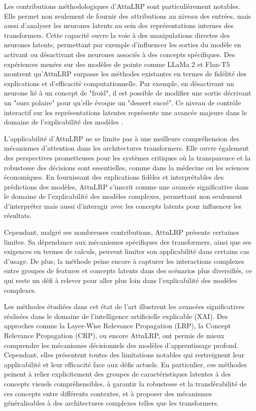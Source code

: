 \documentclass[runningheads]{llncs}
\begin{document}
Les contributions méthodologiques d’AttnLRP sont particulièrement notables. Elle permet non seulement de fournir des attributions au niveau des entrées, mais aussi d’analyser les neurones latents au sein des représentations internes des transformers. Cette capacité ouvre la voie à des manipulations directes des neurones latents, permettant par exemple d’influencer les sorties du modèle en activant ou désactivant des neurones associés à des concepts spécifiques. Des expériences menées sur des modèles de pointe comme LLaMa 2 et Flan-T5 montrent qu’AttnLRP surpasse les méthodes existantes en termes de fidélité des explications et d’efficacité computationnelle. Par exemple, en désactivant un neurone lié à un concept de "froid", il est possible de modifier une sortie décrivant un "ours polaire" pour qu’elle évoque un "dessert sucré". Ce niveau de contrôle interactif sur les représentations latentes représente une avancée majeure dans le domaine de l’explicabilité des modèles \autocite{pmlr-v235-achtibat24a}.

L’applicabilité d’AttnLRP ne se limite pas à une meilleure compréhension des mécanismes d’attention dans les architectures transformers. Elle ouvre également des perspectives prometteuses pour les systèmes critiques où la transparence et la robustesse des décisions sont essentielles, comme dans la médecine ou les sciences économiques. En fournissant des explications fidèles et interprétables des prédictions des modèles, AttnLRP s'inscrit comme une avancée significative dans le domaine de l’explicabilité des modèles complexes, permettant non seulement d’interpréter mais aussi d’interagir avec les concepts latents pour influencer les résultats.

Cependant, malgré ses nombreuses contributions, AttnLRP présente certaines limites. Sa dépendance aux mécanismes spécifiques des transformers, ainsi que ses exigences en termes de calculs, peuvent limiter son applicabilité dans certains cas d’usage. De plus, la méthode peine encore à capturer les interactions complexes entre groupes de features et concepts latents dans des scénarios plus diversifiés, ce qui reste un défi à relever pour aller plus loin dans l’explicabilité des modèles complexes.
\bigskip

Les méthodes étudiées dans cet état de l’art illustrent les avancées significatives réalisées dans le domaine de l’intelligence artificielle explicable (XAI). Des approches comme la Layer-Wise Relevance Propagation (LRP), la Concept Relevance Propagation (CRP), ou encore AttnLRP, ont permis de mieux comprendre les mécanismes décisionnels des modèles d’apprentissage profond. Cependant, elles présentent toutes des limitations notables qui restreignent leur applicabilité et leur efficacité face aux défis actuels. En particulier, ces méthodes peinent à relier explicitement des groupes de caractéristiques latentes à des concepts visuels compréhensibles, à garantir la robustesse et la transférabilité de ces concepts entre différents contextes, et à proposer des mécanismes généralisables à des architectures complexes telles que les transformers.
\end{document}
